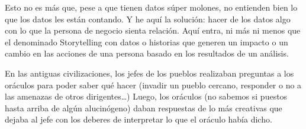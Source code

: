 \documentclass[a4paper,12pt,twocolumn]{article}
\begin{document}
Esto no es más que, pese a que tienen datos súper molones, no entienden bien lo que los datos les están contando. Y he aquí la solución: hacer de los datos algo con lo que la persona de negocio sienta relación. Aquí entra, ni más ni menos que el denominado Storytelling con datos  o historias que generen un impacto o un cambio en las acciones de una persona basado en los resultados de un análisis.

En las antiguas civilizaciones, los jefes de los pueblos realizaban preguntas a los oráculos para poder saber qué hacer (invadir un pueblo cercano, responder o no a las amenazas de otros dirigentes…) Luego, los oráculos (no sabemos si puestos hasta arriba de algún alucinógeno) daban respuestas de lo más creativas que dejaba al jefe con los deberes de interpretar lo que el oráculo había dicho.
\end{document}
